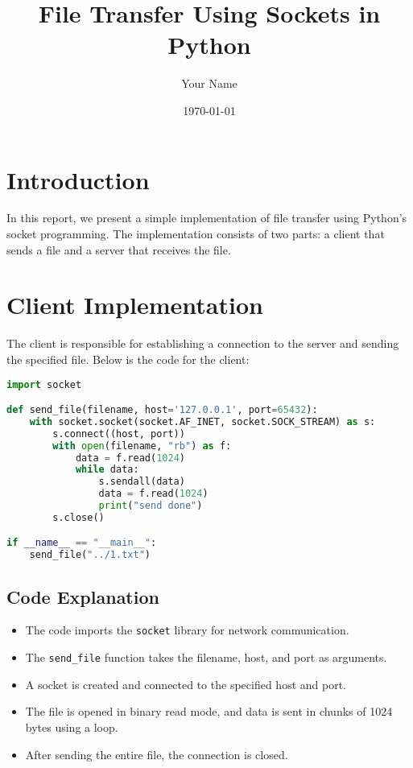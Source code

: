 \documentclass{article}
\title{File Transfer Using Sockets in Python}
\author{Your Name}
\date{\today}
\begin{document}
\maketitle

\section{Introduction}
In this report, we present a simple implementation of file transfer using Python's socket programming. The implementation consists of two parts: a client that sends a file and a server that receives the file.

\section{Client Implementation}
The client is responsible for establishing a connection to the server and sending the specified file. Below is the code for the client:

\begin{lstlisting}[language=Python]
import socket

def send_file(filename, host='127.0.0.1', port=65432):
    with socket.socket(socket.AF_INET, socket.SOCK_STREAM) as s:
        s.connect((host, port))
        with open(filename, "rb") as f:
            data = f.read(1024)
            while data:
                s.sendall(data)
                data = f.read(1024)
                print("send done")
        s.close()

if __name__ == "__main__":
    send_file("../1.txt")
\end{lstlisting}

\subsection{Code Explanation}
\begin{itemize}
    \item The code imports the \texttt{socket} library for network communication.
    \item The \texttt{send\_file} function takes the filename, host, and port as arguments.
    \item A socket is created and connected to the specified host and port.
    \item The file is opened in binary read mode, and data is sent in chunks of 1024 bytes using a loop.
    \item After sending the entire file, the connection is closed.
\end{itemize}
\end{document}
